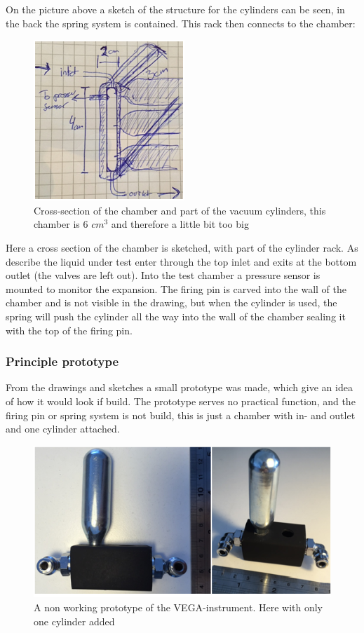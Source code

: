 On the picture above a sketch of the structure for the cylinders can be seen, in the back the spring system is contained. This rack then connects to the chamber:

\begin{figure}[htb]
  \centering
  \includegraphics[scale=1]{figures/GasDetectionAgge/ChamberAndRack.png}
  \caption{Cross-section of the chamber and part of the vacuum cylinders, this chamber is 6 $cm^3$ and therefore a little bit too big}
\end{figure}

Here a cross section of the chamber is sketched, with part of the cylinder rack. As describe the liquid under test enter through the top inlet and exits at the bottom outlet (the valves are left out). Into the test chamber a pressure sensor is mounted to monitor the expansion. The firing pin is carved into the wall of the chamber and is not visible in the drawing, but when the cylinder is used, the spring will push the cylinder all the way into the wall of the chamber sealing it with the top of the firing pin.

\subsubsection{Principle prototype}

From the drawings and sketches a small prototype was made, which give an idea of how it would look if build. The prototype serves no practical function, and the firing pin or spring system is not build, this is just a chamber with in- and outlet and one cylinder attached.

\begin{figure}[htb]
  \centering
  \includegraphics[scale=1]{figures/GasDetectionAgge/Prototype}
  \caption{A non working prototype of the VEGA-instrument. Here with only one cylinder added}
\end{figure}


